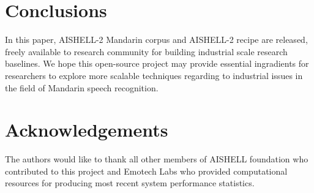 \documentclass[a4paper]{article}
\begin{document}
% 

\section{Conclusions}

In this paper, AISHELL-2 Mandarin corpus and AISHELL-2 recipe are released,
freely available to research community for building industrial scale research
baselines. We hope this open-source project may provide essential ingradients for
researchers to explore more scalable techniques regarding to industrial issues in the field of Mandarin speech recognition.

\section{Acknowledgements}

The authors would like to thank all other members of AISHELL foundation who contributed to this project and Emotech Labs who provided computational resources for producing most recent system performance statistics.





\end{document}
